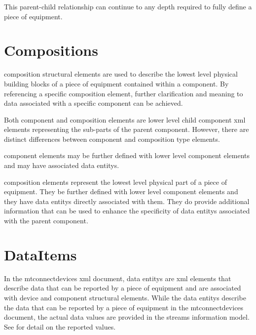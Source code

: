 This parent-child relationship can continue to any depth required to fully define a piece of equipment.




\section{Compositions}
\label{sec:Compositions}
\gls{composition} \glspl{structural element} are used to describe the lowest level physical building blocks of a piece of equipment contained within a \gls{component}. By referencing a specific \gls{composition} element, further clarification and meaning to data associated with a specific \gls{component} can be achieved.

Both \gls{component} and \gls{composition} elements are \gls{lower level} child \gls{component} \gls{xml} elements representing the sub-parts of the parent \gls{component}.  However, there are distinct differences between \gls{component} and \gls{composition} type elements.

\gls{component} elements may be further defined with \gls{lower level} \gls{component} elements and may have associated \glspl{data entity}.

\gls{composition} elements represent the lowest level physical part of a piece of equipment.  They \mustnot be further defined with \gls{lower level} \gls{component} elements and they \mustnot have \glspl{data entity} directly associated with them.   They do provide additional information that can be used to enhance the specificity of \glspl{data entity} associated with the parent \gls{component}.



\section{DataItems}
\label{sec:DataItems}
In the \gls{mtconnectdevices} \gls{xml} document, \glspl{data entity} are \gls{xml} elements that describe data that can be reported by a piece of equipment and are associated with \gls{device} and \gls{component} \glspl{structural element}.   While the \glspl{data entity} describe the data that can be reported by a piece of equipment in the \gls{mtconnectdevices} document, the actual data values are provided in the \gls{streams information model}.   See  for detail on the reported values.

